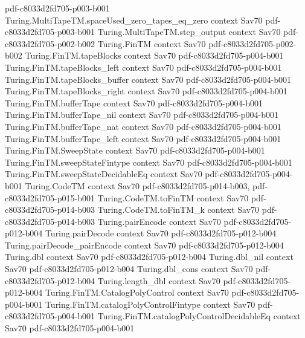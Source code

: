 \begin{theorem}
  {pdf-c8033d2fd705-p003-b001}
\proofstep
  {Turing.MultiTapeTM.spaceUsed_zero_tapes_eq_zero}
  {context}
  {Sav70}
  {pdf-c8033d2fd705-p003-b001}
\proofstep
  {Turing.MultiTapeTM.step_output}
  {context}
  {Sav70}
  {pdf-c8033d2fd705-p002-b002}
\proofstep
  {Turing.FinTM}
  {context}
  {Sav70}
  {pdf-c8033d2fd705-p002-b002}
\proofstep
  {Turing.FinTM.tapeBlocks}
  {context}
  {Sav70}
  {pdf-c8033d2fd705-p004-b001}
\proofstep
  {Turing.FinTM.tapeBlocks_left}
  {context}
  {Sav70}
  {pdf-c8033d2fd705-p004-b001}
\proofstep
  {Turing.FinTM.tapeBlocks_buffer}
  {context}
  {Sav70}
  {pdf-c8033d2fd705-p004-b001}
\proofstep
  {Turing.FinTM.tapeBlocks_right}
  {context}
  {Sav70}
  {pdf-c8033d2fd705-p004-b001}
\proofstep
  {Turing.FinTM.bufferTape}
  {context}
  {Sav70}
  {pdf-c8033d2fd705-p004-b001}
\proofstep
  {Turing.FinTM.bufferTape_nil}
  {context}
  {Sav70}
  {pdf-c8033d2fd705-p004-b001}
\proofstep
  {Turing.FinTM.bufferTape_nat}
  {context}
  {Sav70}
  {pdf-c8033d2fd705-p004-b001}
\proofstep
  {Turing.FinTM.bufferTape_left}
  {context}
  {Sav70}
  {pdf-c8033d2fd705-p004-b001}
\proofstep
  {Turing.FinTM.SweepState}
  {context}
  {Sav70}
  {pdf-c8033d2fd705-p004-b001}
\proofstep
  {Turing.FinTM.sweepStateFintype}
  {context}
  {Sav70}
  {pdf-c8033d2fd705-p004-b001}
\proofstep
  {Turing.FinTM.sweepStateDecidableEq}
  {context}
  {Sav70}
  {pdf-c8033d2fd705-p004-b001}
\proofstep
  {Turing.CodeTM}
  {context}
  {Sav70}
  {pdf-c8033d2fd705-p014-b003,
    pdf-c8033d2fd705-p015-b001}
\proofstep
  {Turing.CodeTM.toFinTM}
  {context}
  {Sav70}
  {pdf-c8033d2fd705-p014-b003}
\proofstep
  {Turing.CodeTM.toFinTM_k}
  {context}
  {Sav70}
  {pdf-c8033d2fd705-p014-b003}
\proofstep
  {Turing.pairEncode}
  {context}
  {Sav70}
  {pdf-c8033d2fd705-p012-b004}
\proofstep
  {Turing.pairDecode}
  {context}
  {Sav70}
  {pdf-c8033d2fd705-p012-b004}
\proofstep
  {Turing.pairDecode_pairEncode}
  {context}
  {Sav70}
  {pdf-c8033d2fd705-p012-b004}
\proofstep
  {Turing.dbl}
  {context}
  {Sav70}
  {pdf-c8033d2fd705-p012-b004}
\proofstep
  {Turing.dbl_nil}
  {context}
  {Sav70}
  {pdf-c8033d2fd705-p012-b004}
\proofstep
  {Turing.dbl_cons}
  {context}
  {Sav70}
  {pdf-c8033d2fd705-p012-b004}
\proofstep
  {Turing.length_dbl}
  {context}
  {Sav70}
  {pdf-c8033d2fd705-p012-b004}
\proofstep
  {Turing.FinTM.CatalogPolyControl}
  {context}
  {Sav70}
  {pdf-c8033d2fd705-p004-b001}
\proofstep
  {Turing.FinTM.catalogPolyControlFintype}
  {context}
  {Sav70}
  {pdf-c8033d2fd705-p004-b001}
\proofstep
  {Turing.FinTM.catalogPolyControlDecidableEq}
  {context}
  {Sav70}
  {pdf-c8033d2fd705-p004-b001}

\end{theorem}
